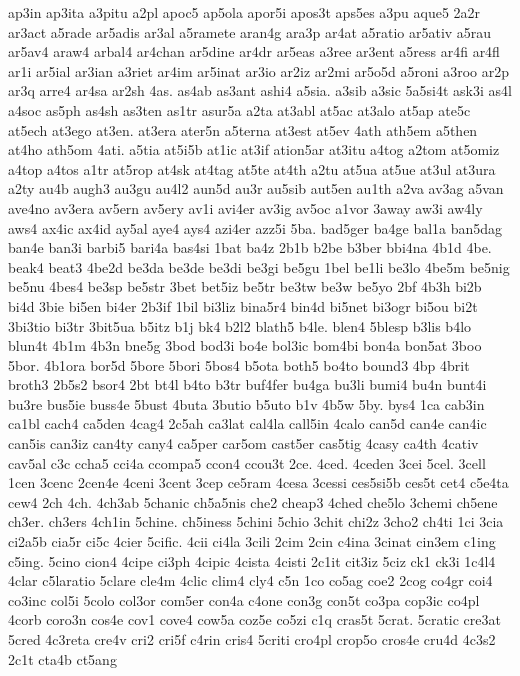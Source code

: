 {ap3in
ap3ita
a3pitu
a2pl
apoc5
ap5ola
apor5i
apos3t
aps5es
a3pu
aque5
2a2r
ar3act
a5rade
ar5adis
ar3al
a5ramete
aran4g
ara3p
ar4at
a5ratio
ar5ativ
a5rau
ar5av4
araw4
arbal4
ar4chan
ar5dine
ar4dr
ar5eas
a3ree
ar3ent
a5ress
ar4fi
ar4fl
ar1i
ar5ial
ar3ian
a3riet
ar4im
ar5inat
ar3io
ar2iz
ar2mi
ar5o5d
a5roni
a3roo
ar2p
ar3q
arre4
ar4sa
ar2sh
4as.
as4ab
as3ant
ashi4
a5sia.
a3sib
a3sic
5a5si4t
ask3i
as4l
a4soc
as5ph
as4sh
as3ten
as1tr
asur5a
a2ta
at3abl
at5ac
at3alo
at5ap
ate5c
at5ech
at3ego
at3en.
at3era
ater5n
a5terna
at3est
at5ev
4ath
ath5em
a5then
at4ho
ath5om
4ati.
a5tia
at5i5b
at1ic
at3if
ation5ar
at3itu
a4tog
a2tom
at5omiz
a4top
a4tos
a1tr
at5rop
at4sk
at4tag
at5te
at4th
a2tu
at5ua
at5ue
at3ul
at3ura
a2ty
au4b
augh3
au3gu
au4l2
aun5d
au3r
au5sib
aut5en
au1th
a2va
av3ag
a5van
ave4no
av3era
av5ern
av5ery
av1i
avi4er
av3ig
av5oc
a1vor
3away
aw3i
aw4ly
aws4
ax4ic
ax4id
ay5al
aye4
ays4
azi4er
azz5i
5ba.
bad5ger
ba4ge
bal1a
ban5dag
ban4e
ban3i
barbi5
bari4a
bas4si
1bat
ba4z
2b1b
b2be
b3ber
bbi4na
4b1d
4be.
beak4
beat3
4be2d
be3da
be3de
be3di
be3gi
be5gu
1bel
be1li
be3lo
4be5m
be5nig
be5nu
4bes4
be3sp
be5str
3bet
bet5iz
be5tr
be3tw
be3w
be5yo
2bf
4b3h
bi2b
bi4d
3bie
bi5en
bi4er
2b3if
1bil
bi3liz
bina5r4
bin4d
bi5net
bi3ogr
bi5ou
bi2t
3bi3tio
bi3tr
3bit5ua
b5itz
b1j
bk4
b2l2
blath5
b4le.
blen4
5blesp
b3lis
b4lo
blun4t
4b1m
4b3n
bne5g
3bod
bod3i
bo4e
bol3ic
bom4bi
bon4a
bon5at
3boo
5bor.
4b1ora
bor5d
5bore
5bori
5bos4
b5ota
both5
bo4to
bound3
4bp
4brit
broth3
2b5s2
bsor4
2bt
bt4l
b4to
b3tr
buf4fer
bu4ga
bu3li
bumi4
bu4n
bunt4i
bu3re
bus5ie
buss4e
5bust
4buta
3butio
b5uto
b1v
4b5w
5by.
bys4
1ca
cab3in
ca1bl
cach4
ca5den
4cag4
2c5ah
ca3lat
cal4la
call5in
4calo
can5d
can4e
can4ic
can5is
can3iz
can4ty
cany4
ca5per
car5om
cast5er
cas5tig
4casy
ca4th
4cativ
cav5al
c3c
ccha5
cci4a
ccompa5
ccon4
ccou3t
2ce.
4ced.
4ceden
3cei
5cel.
3cell
1cen
3cenc
2cen4e
4ceni
3cent
3cep
ce5ram
4cesa
3cessi
ces5si5b
ces5t
cet4
c5e4ta
cew4
2ch
4ch.
4ch3ab
5chanic
ch5a5nis
che2
cheap3
4ched
che5lo
3chemi
ch5ene
ch3er.
ch3ers
4ch1in
5chine.
ch5iness
5chini
5chio
3chit
chi2z
3cho2
ch4ti
1ci
3cia
ci2a5b
cia5r
ci5c
4cier
5cific.
4cii
ci4la
3cili
2cim
2cin
c4ina
3cinat
cin3em
c1ing
c5ing.
5cino
cion4
4cipe
ci3ph
4cipic
4cista
4cisti
2c1it
cit3iz
5ciz
ck1
ck3i
1c4l4
4clar
c5laratio
5clare
cle4m
4clic
clim4
cly4
c5n
1co
co5ag
coe2
2cog
co4gr
coi4
co3inc
col5i
5colo
col3or
com5er
con4a
c4one
con3g
con5t
co3pa
cop3ic
co4pl
4corb
coro3n
cos4e
cov1
cove4
cow5a
coz5e
co5zi
c1q
cras5t
5crat.
5cratic
cre3at
5cred
4c3reta
cre4v
cri2
cri5f
c4rin
cris4
5criti
cro4pl
crop5o
cros4e
cru4d
4c3s2
2c1t
cta4b
ct5ang
}
